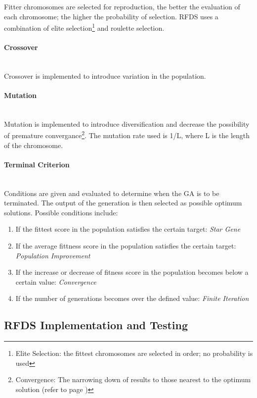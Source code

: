 Fitter chromosomes are selected for reproduction, the better the evaluation of each chromosome; the higher the probability of selection. RFDS uses a combination of elite selection\footnote{Elite Selection: the fittest chromosomes are selected in order; no probability is used} and roulette selection.

\paragraph{Crossover}\mbox{}\\

Crossover is implemented to introduce variation in the population.

\paragraph{Mutation}\mbox{}\\

Mutation is implemented to introduce diversification and decrease the possibility of premature convergance\footnote{Convergence: The narrowing down of results to those nearest to the optimum solution (refer to page \pageref{sec:GAConvergence})}. The mutation rate used is 1/L, where L is the length of the chromosome.

\paragraph{Terminal Criterion}\mbox{}\\

Conditions are given and evaluated to determine when the GA is to be terminated. The output of the generation is then selected as possible optimum solutions. Possible conditions include:

\begin{enumerate}
\item If the fittest score in the population satisfies the certain target: \emph{Star Gene}
\item If the average fittness score in the population satisfies the certain target: \emph{Population Improvement}
\item If the increase or decrease of fitness score in the population becomes below a certain value: \emph{Convergence}
\item If the number of generations becomes over the defined value: \emph{Finite Iteration} 
\end{enumerate}

\subsection{RFDS Implementation and Testing}

